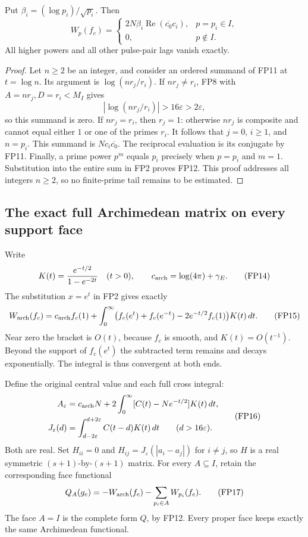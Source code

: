 \begin{lemma}\label{fp:lem:prime}
Put \(\beta_i=(\log p_i)/\sqrt{p_i}\). Then
\[
 W_p(f_c)=
 \begin{cases}
 2N\beta_i\operatorname{Re}(\overline{c_0}c_i),&p=p_i\in I,\\
 0,&p\notin I .
 \end{cases}
 \tag{FP12}\label{fp:fpb:prime}
\]
All higher powers and all other pulse-pair lags vanish exactly.
\end{lemma}
\begin{proof}
Let \(n\ge2\) be an integer, and consider an ordered summand of
FP11 at \(t=\log n\). Its argument is
\(\log(nr_j/r_i)\). If \(nr_j\ne r_i\), FP8 with
\(A=nr_j,D=r_i<M_I\) gives
\[
 |\log(nr_j/r_i)|>16\varepsilon>2\varepsilon,
 \tag{FP13}
\]
so this summand is zero. If \(nr_j=r_i\), then \(r_j=1\):
otherwise \(nr_j\) is composite and cannot equal either \(1\) or
one of the primes \(r_i\). It follows that \(j=0\), \(i\ge1\),
and \(n=p_i\). This summand is \(Nc_i\overline{c_0}\).
The reciprocal evaluation is its conjugate by FP11.
Finally, a prime power \(p^m\) equals \(p_i\) precisely when
\(p=p_i\) and \(m=1\). Substitution into the entire sum in FP2
proves FP12. This proof addresses all integers \(n\ge2\), so no
finite-prime tail remains to be estimated.
\end{proof}

\subsection{The exact full Archimedean matrix on every support face}

Write
\[
 K(t)=\frac{e^{-t/2}}{1-e^{-2t}}\quad(t>0),
 \qquad c_{\rm arch}=\log(4\pi)+\gamma_E .
 \tag{FP14}
\]
The substitution \(x=e^t\) in FP2 gives exactly
\[
 W_{\rm arch}(f_c)=c_{\rm arch}f_c(1)
  +\int_0^\infty
    \bigl(f_c(e^t)+f_c(e^{-t})-2e^{-t/2}f_c(1)\bigr)K(t)\,dt .
 \tag{FP15}\label{fp:fpb:arch}
\]
Near zero the bracket is \(O(t)\), because \(f_c\) is smooth,
and \(K(t)=O(t^{-1})\). Beyond the support of \(f_c(e^t)\)
the subtracted term remains and decays exponentially.
The integral is thus convergent at both ends.

Define the original central value and each full cross integral:
\[
 \begin{aligned}
 A_\varepsilon&=c_{\rm arch}N+
              2\int_0^\infty[C(t)-Ne^{-t/2}]K(t)\,dt,\\
 J_\varepsilon(d)&=\int_{d-2\varepsilon}^{d+2\varepsilon}C(t-d)K(t)\,dt
                       \qquad(d>16\varepsilon).
 \end{aligned}
 \tag{FP16}\label{fp:fpb:AJ}
\]
Both are real. Set \(H_{ii}=0\) and
\(H_{ij}=J_\varepsilon(|a_i-a_j|)\) for \(i\ne j\), so \(H\) is a
real symmetric \((s+1)\)-by-\((s+1)\) matrix.
For every \(A\subseteq I\), retain the corresponding face functional
\[
 Q_A(g_c)=-W_{\rm arch}(f_c)-\sum_{p_i\in A}W_{p_i}(f_c).
 \tag{FP17}
\]
The face \(A=I\) is the complete form \(Q\), by FP12.
Every proper face keeps exactly the same Archimedean functional.

